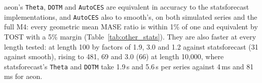 
aeon's \texttt{Theta}, \texttt{DOTM} and \texttt{AutoCES} are equivalent in
accuracy to the statsforecast implementations, and \texttt{AutoCES} also to
smooth's, on both simulated series and the full M4: every geometric mean MASE
ratio is within 1\% of one and equivalent by TOST with a 5\% margin
(Table~\ref{tab:other_stats}). They are also faster at every length tested:
at length 100 by factors of 1.9, 3.0 and 1.2 against statsforecast (31
against smooth), rising to 481, 69 and 3.0 (66) at length 10{,}000, where
statsforecast's \texttt{Theta} and \texttt{DOTM} take 1.9\,s and 5.6\,s per
series against 4\,ms and 81\,ms for aeon.
